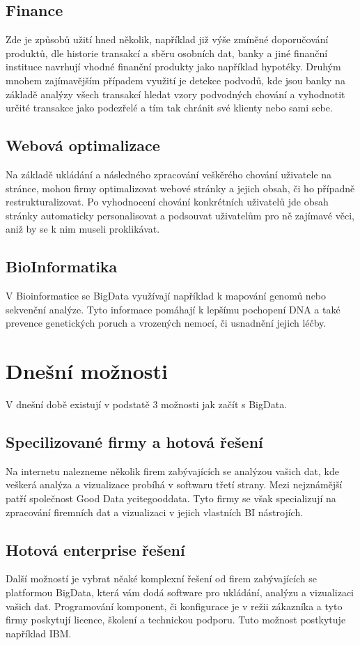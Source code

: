 \documentclass[thesis=M,czech]{FITthesis}[2012/06/26]
\begin{document}
\subsection{Finance}
Zde je způsobů užití hned několik, například již výše zmíněné doporučování produktů, dle historie transakcí a sběru  osobních dat, banky a jiné finanční instituce navrhují vhodné finanční produkty jako například hypotéky. Druhým mnohem zajímavějším případem využití je detekce podvodů, kde jsou banky na základě analýzy všech transakcí hledat vzory podvodných chování a vyhodnotit určité transakce jako podezřelé a tím tak chránit své klienty nebo sami sebe.

\subsection{Webová optimalizace}
Na základě ukládání a následného zpracování veškěrého chování uživatele na stránce, mohou firmy optimalizovat webové stránky a jejich obsah, či ho případně restrukturalizovat. Po vyhodnocení chování konkrétních uživatelů jde obsah stránky automaticky personalisovat a podsouvat uživatelům pro ně zajímavé věci, aniž by se k nim museli proklikávat.

\subsection{BioInformatika}
V Bioinformatice se BigData využívají například k mapování genomů nebo sekvenční analýze. Tyto informace pomáhají k lepšímu pochopení DNA a také prevence genetických poruch a vrozených nemocí, či usnadnění jejich léčby. \cite{industries} 

\section{Dnešní možnosti}
V dnešní době existují v podstatě 3 možnosti jak začít s BigData. 

\subsection{Specilizované firmy a hotová řešení}
Na internetu nalezneme několik firem zabývajících se analýzou vašich dat, kde veškerá analýza a vizualizace probíhá v softwaru třetí strany. Mezi nejznámější patří společnost Good Data ycite{gooddata}. Tyto firmy se však specializují na zpracování firemních dat a vizualizaci v jejich vlastních BI nástrojích.

\subsection{Hotová enterprise řešení}
Další možností je vybrat něaké komplexní řešení od firem zabývajících se platformou BigData, která vám dodá software pro ukládání, analýzu a vizualizaci vašich dat. Programování komponent, či konfigurace je v režii zákazníka a tyto firmy poskytují licence, školení a technickou podporu. Tuto možnost postkytuje například IBM.
\end{document}
